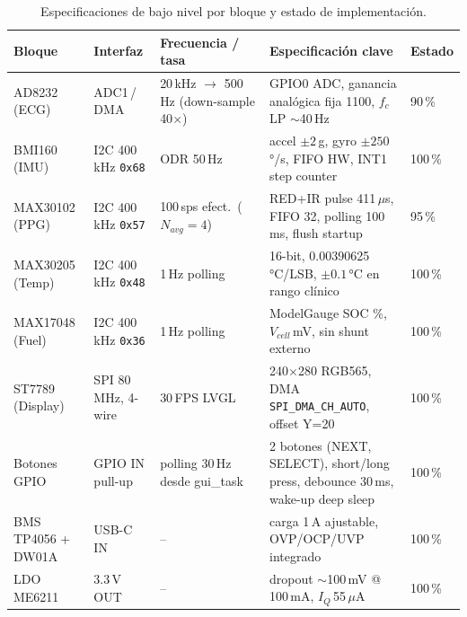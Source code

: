 \documentclass[letterpaper,11pt]{article}
\begin{document}
\begin{table}[H]
    \centering
    \caption{Especificaciones de bajo nivel por bloque y estado de implementación.}
    \label{tab:specs}
    \footnotesize
    \begin{tabular}{|L{2.6cm}|L{2.0cm}|L{2.6cm}|L{4.6cm}|L{2.0cm}|}\hline
    \textbf{Bloque} & \textbf{Interfaz} & \textbf{Frecuencia / tasa} & \textbf{Especificación clave} & \textbf{Estado} \\\hline
    AD8232 (ECG)         & ADC1\,/\,DMA      & 20\,kHz $\to$ 500\,Hz (down-sample 40$\times$)  & GPIO0 ADC, ganancia analógica fija 1100, $f_c$\,LP $\sim$40\,Hz   & 90\,\% \\\hline
    BMI160 (IMU)         & I2C 400\,kHz \texttt{0x68} & ODR 50\,Hz                              & accel $\pm 2$\,g, gyro $\pm 250$\,°/s, FIFO HW, INT1 step counter & 100\,\% \\\hline
    MAX30102 (PPG)       & I2C 400\,kHz \texttt{0x57} & 100\,sps efect.\ ($N_{avg}=4$)         & RED+IR pulse 411\,$\mu$s, FIFO 32, polling 100\,ms, flush startup  & 95\,\% \\\hline
    MAX30205 (Temp)      & I2C 400\,kHz \texttt{0x48} & 1\,Hz polling                          & 16-bit, 0.00390625\,°C/LSB, $\pm 0.1$\,°C en rango clínico        & 100\,\% \\\hline
    MAX17048 (Fuel)      & I2C 400\,kHz \texttt{0x36} & 1\,Hz polling                          & ModelGauge SOC \%, $V_{cell}$\,mV, sin shunt externo               & 100\,\% \\\hline
    ST7789 (Display)     & SPI 80\,MHz, 4-wire & 30\,FPS LVGL                                  & 240$\times$280 RGB565, DMA \texttt{SPI\_DMA\_CH\_AUTO}, offset Y=20 & 100\,\% \\\hline
    Botones GPIO         & GPIO IN pull-up   & polling 30\,Hz desde gui\_task                  & 2 botones (NEXT, SELECT), short/long press, debounce 30\,ms, wake-up deep sleep & 100\,\% \\\hline
    BMS TP4056 + DW01A   & USB-C IN          & --                                              & carga 1\,A ajustable, OVP/OCP/UVP integrado                       & 100\,\% \\\hline
    LDO ME6211           & 3.3\,V OUT        & --                                              & dropout $\sim$100\,mV @ 100\,mA, $I_Q$\,55\,$\mu$A                 & 100\,\% \\\hline

\end{tabular}
\end{table}
\end{document}
